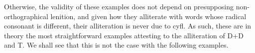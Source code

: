 \begin{mwl}
\end{mwl}



Otherwise, the validity of these examples does not depend on presupposing non-orthographical lenition, and given how they alliterate with words whose radical consonant is different, their alliteration is never due to \gls{cyfl}. As such, these are in theory the most straightforward examples attesting to the alliteration of \gls{D}+\gls{D} and \gls{T}.  We shall see that this is not the case with the following examples.

